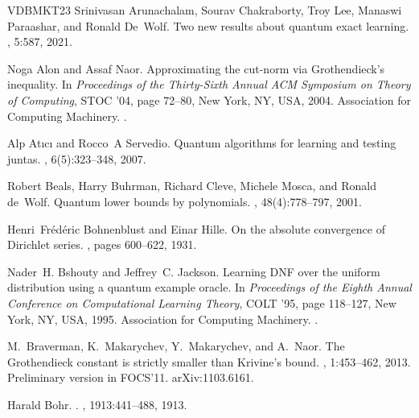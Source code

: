 \documentclass[11pt]{article}
\theoremstyle{plain}
\theoremstyle{plain}
\theoremstyle{definition}
\theoremstyle{remark}
\theoremstyle{named}
\begin{document}
\begin{thebibliography}{VDBMKT23}
Srinivasan Arunachalam, Sourav Chakraborty, Troy Lee, Manaswi Paraashar, and
  Ronald De~Wolf.
\newblock Two new results about quantum exact learning.
, 5:587, 2021.

Noga Alon and Assaf Naor.
\newblock Approximating the cut-norm via {G}rothendieck's inequality.
\newblock In {\em Proceedings of the Thirty-Sixth Annual ACM Symposium on
  Theory of Computing}, STOC '04, page 72–80, New York, NY, USA, 2004.
  Association for Computing Machinery.
\newblock \href {https://doi.org/10.1145/1007352.1007371}
  {}.

Alp At{\i}c{\i} and Rocco~A Servedio.
\newblock Quantum algorithms for learning and testing juntas.
, 6(5):323--348, 2007.

Robert Beals, Harry Buhrman, Richard Cleve, Michele Mosca, and Ronald de~Wolf.
\newblock Quantum lower bounds by polynomials.
, 48(4):778–797, 2001.

Henri~Fr{\'e}d{\'e}ric Bohnenblust and Einar Hille.
\newblock On the absolute convergence of {D}irichlet series.
, pages 600--622, 1931.

Nader~H. Bshouty and Jeffrey~C. Jackson.
\newblock Learning {DNF} over the uniform distribution using a quantum example
  oracle.
\newblock In {\em Proceedings of the Eighth Annual Conference on Computational
  Learning Theory}, COLT '95, page 118–127, New York, NY, USA, 1995.
  Association for Computing Machinery.
\newblock \href {https://doi.org/10.1145/225298.225312}
  {}.

M.~Braverman, K.~Makarychev, Y.~Makarychev, and A.~Naor.
\newblock The {G}rothendieck constant is strictly smaller than {K}rivine's
  bound.
, 1:453--462, 2013.
\newblock Preliminary version in FOCS'11. arXiv:1103.6161.

Harald Bohr.
.
, 1913:441--488, 1913.


\end{thebibliography}
\end{document}
